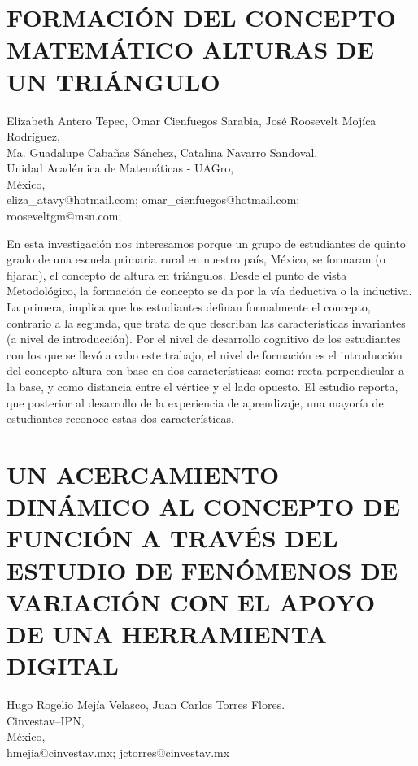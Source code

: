 \setcounter{section}{71}


\section{FORMACIÓN DEL CONCEPTO MATEMÁTICO ALTURAS DE UN TRIÁNGULO }

\begin{datos}
Elizabeth Antero Tepec, Omar Cienfuegos Sarabia, José Roosevelt Mojíca Rodríguez,\\
 Ma. Guadalupe  Cabañas Sánchez, Catalina Navarro Sandoval. \\
Unidad Académica de Matemáticas - UAGro, \\
\hfill México, \\
\hfill eliza\_{}atavy@hotmail.com; omar\_{}cienfuegos@hotmail.com;\\
\hfill rooseveltgm@msn.com;    
\end{datos}

En esta investigación nos interesamos porque un grupo de estudiantes
de quinto grado de una escuela primaria rural en nuestro país, México,
se formaran (o fijaran), el concepto de altura en triángulos. Desde
el punto de vista Metodológico, la formación de concepto se da por
la vía deductiva o la inductiva. La primera, implica que los estudiantes
definan formalmente el concepto, contrario a la segunda, que trata
de que describan las características invariantes (a nivel de introducción).
Por el nivel de desarrollo cognitivo de los estudiantes con los que
se llevó a cabo este trabajo, el nivel de formación es el introducción
del concepto altura con base en dos características: como: recta perpendicular
a la base, y como distancia entre el vértice y el lado opuesto. El
estudio reporta, que posterior al desarrollo de la experiencia de
aprendizaje, una mayoría de estudiantes reconoce estas dos características.


\section{UN ACERCAMIENTO DINÁMICO AL CONCEPTO DE FUNCIÓN A TRAVÉS DEL ESTUDIO
DE FENÓMENOS DE VARIACIÓN CON EL APOYO DE UNA HERRAMIENTA DIGITAL}

\begin{datos}
Hugo Rogelio Mejía Velasco, Juan Carlos Torres Flores.\\
Cinvestav–IPN, \\
\hfill México, \\
\hfill hmejia@cinvestav.mx; jctorres@cinvestav.mx
\end{datos}

